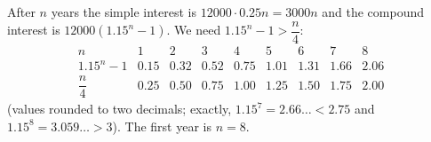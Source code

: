 After $n$ years the simple interest is $12000\cdot0.25n=3000n$ and the compound interest is $12000(1.15^n-1)$. We need $1.15^n-1>\dfrac{n}{4}$:
\[
\begin{array}{c|cccccccc}
n&1&2&3&4&5&6&7&8\\ \hline
1.15^n-1&0.15&0.32&0.52&0.75&1.01&1.31&1.66&2.06\\
\dfrac{n}{4}&0.25&0.50&0.75&1.00&1.25&1.50&1.75&2.00
\end{array}
\]
(values rounded to two decimals; exactly, $1.15^7=2.66\ldots<2.75$ and $1.15^8=3.059\ldots>3$). The first year is $n=\boxed{8}$.
